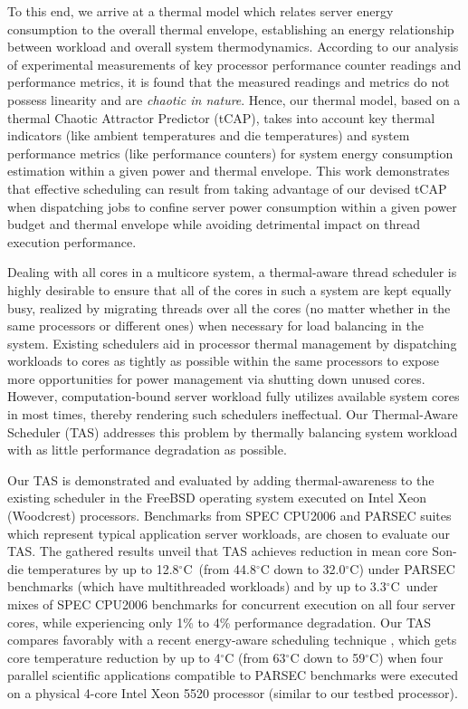 \documentclass[times, 10pt,twocolumn]{IEEEtran}
\begin{document}
To this end, we arrive at a thermal model which relates server energy
consumption to the overall thermal envelope, establishing an energy
relationship between workload and overall system thermodynamics.
According to our analysis of experimental measurements of key processor
performance counter readings and performance metrics, it is found that
the measured readings and metrics do not possess linearity and are
\textit{chaotic in nature}.  Hence, our thermal model, based on a
thermal Chaotic Attractor Predictor (tCAP), takes into account key
thermal indicators (like ambient temperatures and die temperatures) and
system performance metrics (like performance counters) for system energy
consumption estimation within a given power and thermal envelope.  This
work demonstrates that effective scheduling can result from taking
advantage of our devised tCAP when dispatching jobs to confine server
power consumption within a given power budget and thermal envelope while
avoiding detrimental impact on thread execution performance.

Dealing with all cores in a multicore system, a thermal-aware thread
scheduler is highly desirable to ensure that all of the cores in such a
system are kept equally busy, realized by migrating threads over all the
cores (no matter whether in the same processors or different ones) when
necessary for load balancing in the system.  Existing schedulers aid in
processor thermal management by dispatching workloads to cores as
tightly as possible within the same processors to expose more
opportunities for power management via shutting down unused cores.
However, computation-bound server workload fully utilizes available
system cores in most times, thereby rendering such schedulers
ineffectual.  Our Thermal-Aware Scheduler (TAS) addresses this problem
by thermally balancing system workload with as little performance
degradation as possible.  

Our TAS is demonstrated and evaluated by adding thermal-awareness to the
existing scheduler in the FreeBSD operating system executed on Intel
Xeon (Woodcrest) processors.  Benchmarks from SPEC CPU2006 and PARSEC
suites which represent typical application server workloads, are chosen
to evaluate our TAS.  The gathered results unveil that TAS achieves
reduction in mean core Son-die temperatures by up to 12.8$^{\circ}$C\
(from 44.8$^\circ$C down to 32.0$^\circ$C) under PARSEC benchmarks
(which have multithreaded workloads) and by up to 3.3$^{\circ}$C\ under
mixes of SPEC CPU2006 benchmarks for concurrent execution on all four
server cores, while experiencing only 1\% to 4\% performance
degradation.  Our TAS compares favorably with a recent energy-aware
scheduling technique \cite{Sarood2011}, which gets core temperature
reduction by up to 4$^\circ$C (from 63$^\circ$C down to 59$^\circ$C)
when four parallel scientific applications compatible to PARSEC
benchmarks were executed on a physical 4-core Intel Xeon 5520 processor
(similar to our testbed processor).
\end{document}

